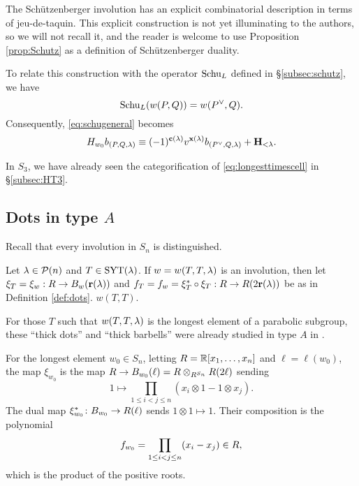 The Sch\"utzenberger involution has an explicit combinatorial description in terms of jeu-de-taquin.  This explicit construction is not yet illuminating to the authors, so we will not recall it, and the reader is welcome to use Proposition \ref{prop:Schutz} as a definition of Sch\"utzenberger duality.

To relate this construction with the operator $\operatorname{Schu}_L$ defined in \S\ref{subsec:schutz}, we have 
\begin{equation} \operatorname{Schu}_L(w(P,Q)) = w(P^\vee,Q). \end{equation} Consequently, \eqref{eq:schugeneral} becomes
\begin{equation} \label{eq:longesttimescell} H_{w_0} b_{(P,Q,\lambda)} \equiv (-1)^{\mathbf{c}(\lambda)} v^{\mathbf{x}(\lambda)} b_{(P^\vee, Q, \lambda)} + {\mathbf H}_{< \lambda}. \end{equation}

\begin{ex} In $S_3$, we have already seen the categorification of \eqref{eq:longesttimescell} in \S\ref{subsec:HT3}. \end{ex}
	


\subsection{Dots in type $A$}
\label{subsec:dotsA}
Recall that every involution in $S_n$ is distinguished.

\begin{defn} Let $\lambda \in {\mathcal{P}}(n)$ and $T \in \operatorname{SYT}(\lambda)$.  If $w=w(T,T,\lambda)$ is an involution, then let $\xi_T = \xi_{w}:R\rightarrow B_w(\mathbf{r}(\lambda))$ and $f_{T} = f_{w}= \xi_T^\ast \circ \xi_T : R\rightarrow R(2\mathbf{r}(\lambda))$ be as in Definition \ref{def:dots}. %
$w(T,T)$. \end{defn}

For those $T$ such that $w(T,T,\lambda)$ is the longest element of a parabolic subgroup, these ``thick dots'' and ``thick barbells'' were already studied in type $A$ in \cite{EThick}.

For the longest element $w_0 \in S_n$, letting $R = {\mathbb{R}}[x_1, \ldots, x_n]$ and $\ell = \ell(w_0)$, the map $\xi_{w_0}$ is the map $R \rightarrow B_{w_0}(\ell) = R \otimes_{R^{S_n}} R(2\ell)$ sending
\begin{equation}
1\mapsto \prod_{1 \le i<j \le n}(x_i\otimes 1 - 1\otimes x_j).
\end{equation}
The dual map $\xi_{w_0}^\ast \colon B_{w_0}\rightarrow R(\ell)$ sends $1\otimes 1\mapsto 1$.  Their composition is the polynomial
\begin{equation} \label{eq:barbellA}
f_{w_0}=\prod_{1 \le i<j \le n}(x_i -  x_j) \in R,
\end{equation}
which is the product of the positive roots.












